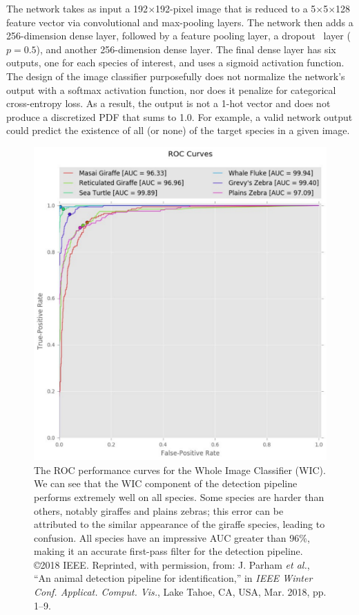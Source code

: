 The network takes as input a 192$\times$192-pixel image that is reduced to a 5$\times$5$\times$128 feature vector via convolutional and max-pooling layers.  The network then adds a 256-dimension dense layer, followed by a feature pooling layer, a dropout~\cite{hinton_improving_2012} layer ($p=0.5$), and another 256-dimension dense layer.  The final dense layer has six outputs, one for each species of interest, and uses a sigmoid activation function.  The design of the image classifier purposefully does not normalize the network's output with a softmax activation function, nor does it penalize for categorical cross-entropy loss.  As a result, the output is not a 1-hot vector and does not produce a discretized PDF that sums to 1.0.  For example, a valid network output could predict the existence of all (or none) of the target species in a given image.

\begin{figure}[!t]
    \begin{center}
        \includegraphics[width=0.9\linewidth]{resources/wic-roc.pdf}
    \end{center}
    \caption{The ROC performance curves for the Whole Image Classifier (WIC).  We can see that the WIC component of the detection pipeline performs extremely well on all species.  Some species are harder than others, notably giraffes and plains zebras; this error can be attributed to the similar appearance of the giraffe species, leading to confusion.  All species have an impressive AUC greater than 96\%, making it an accurate first-pass filter for the detection pipeline.  \copyright 2018 IEEE. Reprinted, with permission, from: J. Parham \textit{et al.}, ``An animal detection pipeline for identification,'' in \textit{IEEE Winter Conf. Applicat. Comput. Vis.}, Lake Tahoe, CA, USA, Mar. 2018, pp. 1–9.}
    \label{fig:performance-wic}
\end{figure}

